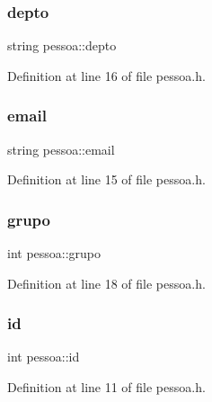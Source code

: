 \hypertarget{classpessoa_ac75b9d5e9934fdcb46c0d8b2c06a08b2}{}\label{classpessoa_ac75b9d5e9934fdcb46c0d8b2c06a08b2} 
\subsubsection{\texorpdfstring{depto}{depto}}
{\footnotesize\ttfamily string pessoa\+::depto}



Definition at line 16 of file pessoa.\+h.

\hypertarget{classpessoa_a8629e223b05473916ecda357a5fe1ad1}{}\label{classpessoa_a8629e223b05473916ecda357a5fe1ad1} 
\subsubsection{\texorpdfstring{email}{email}}
{\footnotesize\ttfamily string pessoa\+::email}



Definition at line 15 of file pessoa.\+h.

\hypertarget{classpessoa_a6930db502e29734eb026e291cf534ed9}{}\label{classpessoa_a6930db502e29734eb026e291cf534ed9} 
\subsubsection{\texorpdfstring{grupo}{grupo}}
{\footnotesize\ttfamily int pessoa\+::grupo}



Definition at line 18 of file pessoa.\+h.

\hypertarget{classpessoa_a8e80bd7d70d7d29b248ef5ec77720b5b}{}\label{classpessoa_a8e80bd7d70d7d29b248ef5ec77720b5b} 
\subsubsection{\texorpdfstring{id}{id}}
{\footnotesize\ttfamily int pessoa\+::id}



Definition at line 11 of file pessoa.\+h.

\hypertarget{classpessoa_a7ff09497b62adeb87afd1531d72dee78}{}\label{classpessoa_a7ff09497b62adeb87afd1531d72dee78} 
